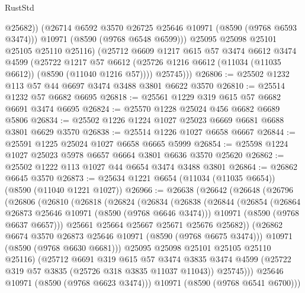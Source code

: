 \begin{lexlean}{RustStd}
\begin{coremodule}
                @25682))
            (@26714 @6592 @3570 @26725 @25646 @10971 (@8590 (@9768 @6593 @3474)))
            @10971
            (@8590 (@9768 @6548 @6599)))
          @25095
          @25098
          @25101
          @25105
          @25110
          @25116)
        (@25712
          @6609
          @1217
          @615
          @57
          @3474
          @6612
          @3474
          @4599
          (@25722
            @1217
            @57
            @6612
            (@25726 @1216 @6612 (@11034 (@11035 @6612)) (@8590 (@11040 @1216 @57))))
          @25745)))
@26806 := @25502 @1232 @113 @57 @44 @6697 @3474 @3488 @3801 @6622 @3570
@26810 := @25514 @1232 @57 @6682 @6695
@26818 := @25561 @1229 @319 @615 @57 @6682 @6691 @3474 @6695
@26824 := @25570 @1228 @25024 @456 @6682 @6689 @5806
@26834 := @25502 @1226 @1224 @1027 @25023 @6669 @6681 @6688 @3801 @6629 @3570
@26838 := @25514 @1226 @1027 @6658 @6667
@26844 := @25591 @1225 @25024 @1027 @6658 @6665 @5999
@26854 := @25598 @1224 @1027 @25023 @5978 @6657 @6664 @3801 @6636 @3570 @25620
@26862 := @25502 @1222 @113 @1027 @44 @6654 @3474 @3488 @3801
@26864 := @26862 @6645 @3570
@26873 := @25634 @1221 @6654 (@11034 (@11035 @6654)) (@8590 (@11040 @1221 @1027))
@26966 := @26638
    (@26642
      (@26648
        (@26796
          (@26806
            (@26810
              (@26818
                (@26824
                  (@26834
                    (@26838
                      (@26844
                        (@26854
                          (@26864 @26873 @25646 @10971 (@8590 (@9768 @6646 @3474)))
                          @10971
                          (@8590 (@9768 @6637 @6657)))
                        @25661
                        @25664
                        @25667
                        @25671
                        @25676
                        @25682))
                    (@26862 @6674 @3570 @26873 @25646 @10971 (@8590 (@9768 @6675 @3474)))
                    @10971
                    (@8590 (@9768 @6630 @6681)))
                  @25095
                  @25098
                  @25101
                  @25105
                  @25110
                  @25116)
                (@25712
                  @6691
                  @319
                  @615
                  @57
                  @3474
                  @3835
                  @3474
                  @4599
                  (@25722 @319 @57 @3835 (@25726 @318 @3835 @11037 @11043))
                  @25745)))
            @25646
            @10971
            (@8590 (@9768 @6623 @3474)))
          @10971
          (@8590 (@9768 @6541 @6700)))

\end{coremodule}
\end{lexlean}
